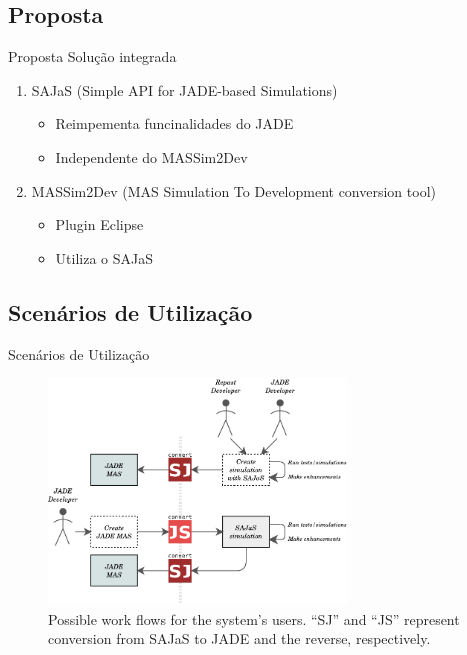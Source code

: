 
\subsection{Proposta}
\begin{frame}{Proposta}
	Solução integrada
	\begin{enumerate}
		\item SAJaS (Simple API for JADE-based Simulations)
		\begin{itemize}
			\item Reimpementa funcinalidades do JADE
			\item Independente do MASSim2Dev
		\end{itemize}
		\item MASSim2Dev (MAS Simulation To Development conversion tool)
		\begin{itemize}
			\item Plugin Eclipse
			\item Utiliza o SAJaS
		\end{itemize}
	\end{enumerate}
\end{frame}

\subsection{Scenários de Utilização}
\begin{frame}{Scenários de Utilização}
	\begin{figure}
		\centering
		\includegraphics[height=6cm]{figures/prototypeFlow.pdf}
		\caption{
			Possible work flows for the system's users. ``SJ'' and ``JS'' represent conversion from SAJaS to JADE and the reverse, respectively.
		}
		\label{fig:prototypeFlow}
	\end{figure}
\end{frame}